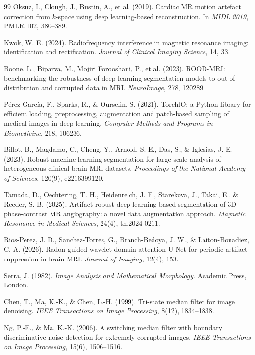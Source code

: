 \documentclass[12pt]{article}
\theoremstyle{definition}
\theoremstyle{plain}
\begin{document}
\begin{thebibliography}{99}
Oksuz, I., Clough, J., Bustin, A., et al. (2019). Cardiac MR motion artefact
correction from $k$-space using deep learning-based reconstruction. In
\emph{MIDL 2019}, PMLR 102, 380--389.

Kwok, W. E. (2024). Radiofrequency interference in magnetic resonance imaging:
identification and rectification. \emph{Journal of Clinical Imaging Science}, 14, 33.

Boone, L., Biparva, M., Mojiri Forooshani, P., et al. (2023). ROOD-MRI:
benchmarking the robustness of deep learning segmentation models to
out-of-distribution and corrupted data in MRI. \emph{NeuroImage}, 278, 120289.

P\'erez-Garc\'ia, F., Sparks, R., \& Ourselin, S. (2021). TorchIO: a Python library
for efficient loading, preprocessing, augmentation and patch-based sampling of
medical images in deep learning. \emph{Computer Methods and Programs in
Biomedicine}, 208, 106236.

Billot, B., Magdamo, C., Cheng, Y., Arnold, S. E., Das, S., \& Iglesias, J. E.
(2023). Robust machine learning segmentation for large-scale analysis of
heterogeneous clinical brain MRI datasets. \emph{Proceedings of the National Academy
of Sciences}, 120(9), e2216399120.

Tamada, D., Oechtering, T. H., Heidenreich, J. F., Starekova, J., Takai, E., \&
Reeder, S. B. (2025). Artifact-robust deep learning-based segmentation of 3D
phase-contrast MR angiography: a novel data augmentation approach.
\emph{Magnetic Resonance in Medical Sciences}, 24(4), tn.2024-0211.

Rios-Perez, J. D., Sanchez-Torres, G., Branch-Bedoya, J. W., \& Laiton-Bonadiez,
C. A. (2026). Radon-guided wavelet-domain attention U-Net for periodic artifact
suppression in brain MRI. \emph{Journal of Imaging}, 12(4), 153.

Serra, J. (1982). \emph{Image Analysis and Mathematical Morphology}. Academic Press,
London.

Chen, T., Ma, K.-K., \& Chen, L.-H. (1999). Tri-state median filter for image
denoising. \emph{IEEE Transactions on Image Processing}, 8(12), 1834--1838.

Ng, P.-E., \& Ma, K.-K. (2006). A switching median filter with boundary
discriminative noise detection for extremely corrupted images. \emph{IEEE
Transactions on Image Processing}, 15(6), 1506--1516.

\end{thebibliography}
\end{document}
